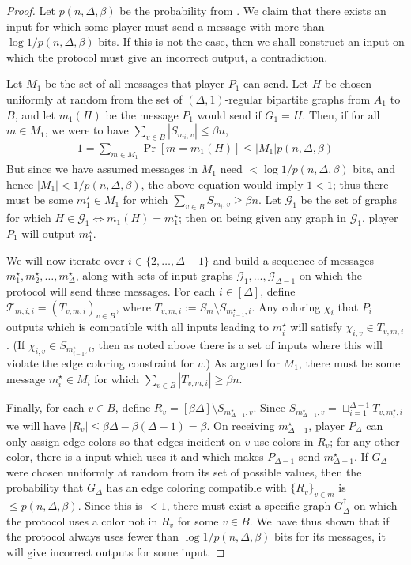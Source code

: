 \documentclass[10pt]{article}
\theoremstyle{definition}\newtheorem{definition}[lemma]{Definition}
\theoremstyle{remark}  \newtheorem*{remark}{Remark}
\newcommand{\cG}{\mathcal{G}}
\newcommand{\cT}{\mathcal{T}}
\begin{document}
\begin{proof}
  Let $p(n, \Delta, \beta)$ be the probability from .
  We claim that there exists an input for which some player must send a message with more than
  $\log 1/p(n, \Delta, \beta)$ bits. If this is not the case, then we shall construct
  an input on which the protocol must give an incorrect output, a contradiction.
   
  Let $M_1$ be the set of all messages that player $P_1$ can send. Let $H$
  be chosen uniformly at random from the set of $(\Delta,1)$-regular bipartite graphs
  from $A_1$ to $B$, and let $m_1(H)$ be the message $P_1$ would send if $G_1 = H$.
  Then, if for all $m \in M_1$, we were to have $\sum_{v\in B} |S_{m_i,v}| \le \beta n$, 
  \begin{align*}
    1 = \sum_{m \in M_1} \Pr[m = m_1(H)] \le |M_1| p(n, \Delta, \beta) 
  \end{align*}
  But since we have assumed messages in $M_1$ need $< \log 1/p(n, \Delta, \beta)$
  bits, and hence $|M_1| < 1 / p(n, \Delta, \beta)$, the above equation would
  imply $1 < 1$; thus there must be some $m_1^\star \in M_1$ for which
  $\sum_{v\in B} {S_{m_i,v}} \ge \beta n$. Let $\cG_1$ be the set of graphs
  for which $H \in \cG_1 \iff m_1(H) = m_1^\star$; then on being given 
  any graph in $\cG_1$, player $P_1$ will output $m_1^\star$.
  
  We will now iterate over $i \in \{2,\ldots,\Delta - 1\}$ and build a sequence
  of messages $m_1^\star, m_2^\star, \ldots, m_\Delta^\star$, along with sets
  of input graphs $\cG_1,\ldots,\cG_{\Delta-1}$ on which the protocol will send
  these messages. For each $i \in [\Delta]$, define $\cT_{m,i,i} = (T_{v, m, i})_{v \in B}$,
  where $T_{v,m,i} := S_m \setminus S_{m_{i-1}^\star,i}$. Any coloring $\chi_i$ 
  that $P_i$ outputs which is compatible with all inputs leading to $m_i^\star$ 
  will satisfy $\chi_{i,v} \in T_{v,m,i}$. (If $\chi_{i,v} \in S_{m_{i-1}^\star,i}$,
  then as noted above there is a set of inputs where this will violate
  the edge coloring constraint for $v$.) As argued for $M_1$, there must be some
  message $m_i^\star \in M_i$ for which $\sum_{v \in B} |T_{v, m, i}| \ge \beta n$.
  
  Finally, for each $v \in B$, define $R_v = [\beta \Delta] \setminus S_{m_{\Delta-1}^\star,v}$.
  Since $S_{m_{\Delta-1}^\star,v} = \sqcup_{i = 1}^{\Delta - 1} T_{v, m_i^\star, i}$
  we will have $|R_v| \le \beta \Delta - \beta (\Delta - 1) = \beta$. On receiving
  $m_{\Delta -1}^\star$, player $P_\Delta$ can only assign edge colors so that
  edges incident on $v$ use colors in $R_v$; for any other color, there is a
  input which uses it and which makes $P_{\Delta - 1}$ send $m_{\Delta -1}^\star$.
  If $G_\Delta$ were chosen uniformly at random from its set of possible values,
  then the probability that $G_\Delta$ has an edge coloring compatible with
  $\{R_v\}_{v\in m}$ is $\le p(n, \Delta, \beta)$. Since this is $< 1$, there must
  exist a specific graph $G_\Delta^\dagger$ on which the protocol uses a color
  not in $R_v$ for some $v \in B$. We have thus shown that if the protocol always
  uses fewer than $\log 1/p(n, \Delta, \beta)$ bits for its messages, it
  will give incorrect outputs for some input.
  

\end{proof}
\end{document}
